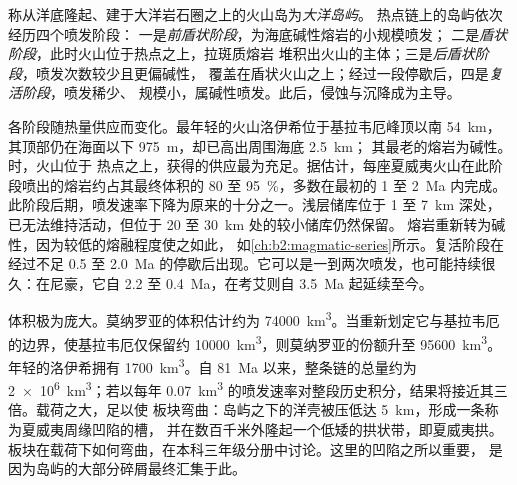 \begin{definition}\label{def:b2:oceanic-islands:stages}
称从洋底隆起、建于大洋岩石圈之上的火山岛为\emph{大洋岛屿}。
热点链上的岛屿依次经历四个喷发阶段：
一是\emph{前盾状阶段}，为海底碱性熔岩的小规模喷发；
二是\emph{盾状阶段}，此时火山位于热点之上，拉斑质熔岩
堆积出火山的主体；三是\emph{后盾状阶段}，喷发次数较少且更偏碱性，
覆盖在盾状火山之上；经过一段停歇后，四是\emph{复活阶段}，喷发稀少、
规模小，属碱性喷发。此后，侵蚀与沉降成为主导。
\end{definition}

各阶段随热量供应而变化。最年轻的火山洛伊希位于基拉韦厄峰顶以南 \qty{54}{km}，
其顶部仍在海面以下 \qty{975}{m}，却已高出周围海底 \qty{2.5}{km}；
其最老的熔岩为碱性。时，火山位于
热点之上，获得的供应最为充足。据估计，每座夏威夷火山在此阶段喷出的熔岩约占其最终体积的 80 至
\qty{95}{\percent}，多数在最初的 1 至 \qty{2}{Ma} 内完成。
此阶段后期，喷发速率下降为原来的十分之一。浅层储库位于 1
至 \qty{7}{km} 深处，已无法维持活动，但位于 20 至 \qty{30}{km} 处的较小储库仍然保留。
熔岩重新转为碱性，因为较低的熔融程度使之如此，
如\cref{ch:b2:magmatic-series}所示。复活阶段在经过不足 0.5
至 \qty{2.0}{Ma} 的停歇后出现。它可以是一到两次喷发，也可能持续很久：在尼豪，它自 2.2
至 \qty{0.4}{Ma}，在考艾则自 \qty{3.5}{Ma} 起延续至今。

体积极为庞大。莫纳罗亚的体积估计约为 \qty{74000}{km^3}。当重新划定它与基拉韦厄的边界，使基拉韦厄仅保留约
\qty{10000}{km^3}，则莫纳罗亚的份额升至 \qty{95600}{km^3}。年轻的洛伊希拥有
\qty{1700}{km^3}。自 \qty{81}{Ma} 以来，整条链的总量约为
\qty{2e6}{km^3}；若以每年 \qty{0.07}{km^3} 的喷发速率对整段历史积分，结果将接近其三倍。载荷之大，足以使
板块弯曲：岛屿之下的洋壳被压低达 \qty{5}{km}，形成一条称为夏威夷周缘凹陷的槽，
并在数百千米外隆起一个低矮的拱状带，即夏威夷拱。
板块在载荷下如何弯曲，在本科三年级分册中讨论。这里的凹陷之所以重要，
是因为岛屿的大部分碎屑最终汇集于此。

